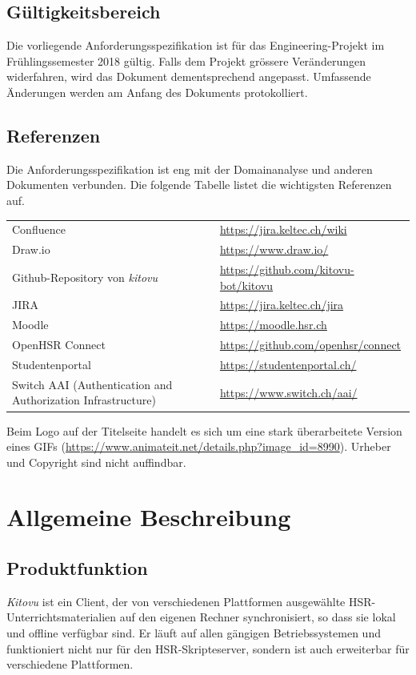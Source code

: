 \documentclass[a4paper]{article}
\let\oldsection\section
\renewcommand\section{\clearpage\oldsection}
\def\jiraurl{https://jira.keltec.ch/jira}
\def\confluenceurl{https://jira.keltec.ch/wiki}
\begin{document}
\subsection{Gültigkeitsbereich}
Die vorliegende Anforderungsspezifikation ist für das Engineering-Projekt im Frühlingssemester 2018 gültig. Falls dem Projekt grössere Veränderungen widerfahren, wird das Dokument dementsprechend angepasst. Umfassende Änderungen werden am Anfang des Dokuments protokolliert.

\subsection{Referenzen}
Die Anforderungsspezifikation ist eng mit der Domainanalyse und anderen Dokumenten verbunden. Die folgende Tabelle listet die wichtigsten Referenzen auf.

\begin{tabulary}{\linewidth}{Ll}
	Confluence & \url{\confluenceurl} \\
	Draw.io & \url{https://www.draw.io/} \\
	Github-Repository von \emph{kitovu} & \url{https://github.com/kitovu-bot/kitovu} \\
	JIRA	& \url{\jiraurl} \\
	Moodle & \url{https://moodle.hsr.ch} \\
	OpenHSR Connect & \url{https://github.com/openhsr/connect} \\
	Studentenportal & \url{https://studentenportal.ch/} \\
	Switch AAI \newline (Authentication and Authorization Infrastructure)& \url{https://www.switch.ch/aai/} \\
\end{tabulary}

Beim Logo auf der Titelseite handelt es sich um eine stark überarbeitete Version eines GIFs (\url{https://www.animateit.net/details.php?image_id=8990}). Urheber und Copyright sind nicht auffindbar.

\pagebreak
\section{Allgemeine Beschreibung}

\subsection{Produktfunktion}
\emph{Kitovu} ist ein Client, der von verschiedenen Plattformen ausgewählte HSR-Unterrichtsmaterialien auf den eigenen Rechner synchronisiert, so dass sie lokal und offline verfügbar sind. Er läuft auf allen gängigen Betriebssystemen und funktioniert nicht nur für den HSR-Skripteserver, sondern ist auch erweiterbar für verschiedene Plattformen.
\end{document}
